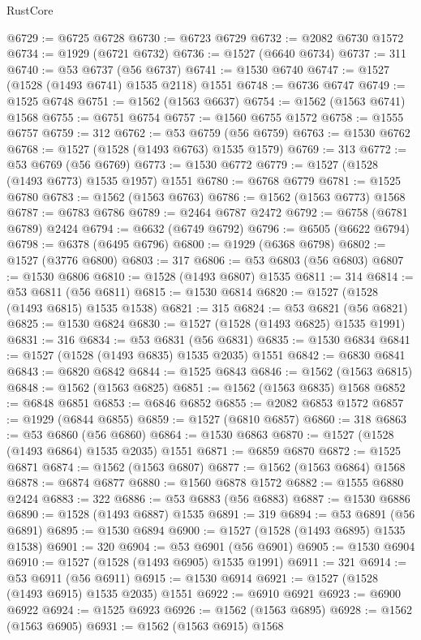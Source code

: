 \begin{lexlean}{RustCore}
\begin{coremodule}
@6729 := @6725 @6728
@6730 := @6723 @6729
@6732 := @2082 @6730 @1572
@6734 := @1929 (@6721 @6732)
@6736 := @1527 (@6640 @6734)
@6737 := 311
@6740 := @53 @6737 (@56 @6737)
@6741 := @1530 @6740
@6747 := @1527 (@1528 (@1493 @6741) @1535 @2118) @1551
@6748 := @6736 @6747
@6749 := @1525 @6748
@6751 := @1562 (@1563 @6637)
@6754 := @1562 (@1563 @6741) @1568
@6755 := @6751 @6754
@6757 := @1560 @6755 @1572
@6758 := @1555 @6757
@6759 := 312
@6762 := @53 @6759 (@56 @6759)
@6763 := @1530 @6762
@6768 := @1527 (@1528 (@1493 @6763) @1535 @1579)
@6769 := 313
@6772 := @53 @6769 (@56 @6769)
@6773 := @1530 @6772
@6779 := @1527 (@1528 (@1493 @6773) @1535 @1957) @1551
@6780 := @6768 @6779
@6781 := @1525 @6780
@6783 := @1562 (@1563 @6763)
@6786 := @1562 (@1563 @6773) @1568
@6787 := @6783 @6786
@6789 := @2464 @6787 @2472
@6792 := @6758 (@6781 @6789) @2424
@6794 := @6632 (@6749 @6792)
@6796 := @6505 (@6622 @6794)
@6798 := @6378 (@6495 @6796)
@6800 := @1929 (@6368 @6798)
@6802 := @1527 (@3776 @6800)
@6803 := 317
@6806 := @53 @6803 (@56 @6803)
@6807 := @1530 @6806
@6810 := @1528 (@1493 @6807) @1535
@6811 := 314
@6814 := @53 @6811 (@56 @6811)
@6815 := @1530 @6814
@6820 := @1527 (@1528 (@1493 @6815) @1535 @1538)
@6821 := 315
@6824 := @53 @6821 (@56 @6821)
@6825 := @1530 @6824
@6830 := @1527 (@1528 (@1493 @6825) @1535 @1991)
@6831 := 316
@6834 := @53 @6831 (@56 @6831)
@6835 := @1530 @6834
@6841 := @1527 (@1528 (@1493 @6835) @1535 @2035) @1551
@6842 := @6830 @6841
@6843 := @6820 @6842
@6844 := @1525 @6843
@6846 := @1562 (@1563 @6815)
@6848 := @1562 (@1563 @6825)
@6851 := @1562 (@1563 @6835) @1568
@6852 := @6848 @6851
@6853 := @6846 @6852
@6855 := @2082 @6853 @1572
@6857 := @1929 (@6844 @6855)
@6859 := @1527 (@6810 @6857)
@6860 := 318
@6863 := @53 @6860 (@56 @6860)
@6864 := @1530 @6863
@6870 := @1527 (@1528 (@1493 @6864) @1535 @2035) @1551
@6871 := @6859 @6870
@6872 := @1525 @6871
@6874 := @1562 (@1563 @6807)
@6877 := @1562 (@1563 @6864) @1568
@6878 := @6874 @6877
@6880 := @1560 @6878 @1572
@6882 := @1555 @6880 @2424
@6883 := 322
@6886 := @53 @6883 (@56 @6883)
@6887 := @1530 @6886
@6890 := @1528 (@1493 @6887) @1535
@6891 := 319
@6894 := @53 @6891 (@56 @6891)
@6895 := @1530 @6894
@6900 := @1527 (@1528 (@1493 @6895) @1535 @1538)
@6901 := 320
@6904 := @53 @6901 (@56 @6901)
@6905 := @1530 @6904
@6910 := @1527 (@1528 (@1493 @6905) @1535 @1991)
@6911 := 321
@6914 := @53 @6911 (@56 @6911)
@6915 := @1530 @6914
@6921 := @1527 (@1528 (@1493 @6915) @1535 @2035) @1551
@6922 := @6910 @6921
@6923 := @6900 @6922
@6924 := @1525 @6923
@6926 := @1562 (@1563 @6895)
@6928 := @1562 (@1563 @6905)
@6931 := @1562 (@1563 @6915) @1568

\end{coremodule}
\end{lexlean}
